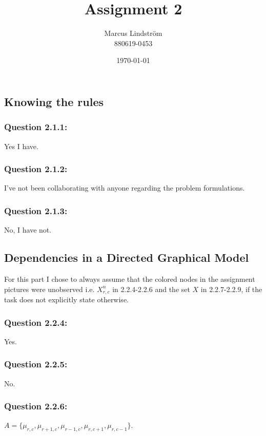 \documentclass[a4paper]{article}
\title{Assignment 2}
\author{Marcus Lindström \\ 880619-0453}
\date{\today}
\begin{document}
\setcounter{section}{2}
\maketitle
\subsection{Knowing the rules}
\vspace{10pt}
\subsubsection*{Question 2.1.1:}

\noindent Yes I have.

\subsubsection*{Question 2.1.2:}

\noindent I've not been collaborating with anyone regarding the problem formulations.

\subsubsection*{Question 2.1.3:}

\noindent No, I have not.

\subsection{Dependencies in a Directed Graphical Model}

\noindent For this part I chose to always assume that the colored nodes in the assignment pictures were unobserved i.e. $X_{r,c}^n$ in 2.2.4-2.2.6 and the set $X$ in 2.2.7-2.2.9, if the task does not explicitly state otherwise. 

\subsubsection*{Question 2.2.4:}
\noindent Yes.
\subsubsection*{Question 2.2.5:}
\noindent No.
\subsubsection*{Question 2.2.6:}
\noindent $A=\{ \mu_{r,c},\mu_{r+1,c},\mu_{r-1,c},\mu_{r,c+1},\mu_{r,c-1}\}$.
\end{document}
